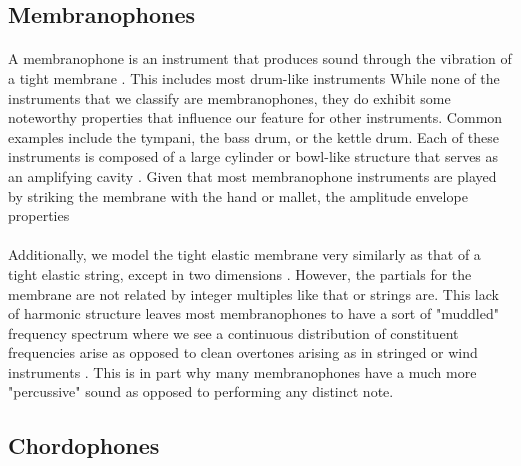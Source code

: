 \documentclass[12pt,letterpaper]{article}
\begin{document}

\subsection{Membranophones}
\label{subsec-membranophones}

\paragraph*{}A membranophone is an instrument that produces sound through the vibration of a tight membrane \cite{Hornbostel}. This includes most drum-like instruments While none of the instruments that we classify are membranophones, they do exhibit some noteworthy properties that influence our feature for other instruments. Common examples include the tympani, the bass drum, or the kettle drum. Each of these instruments is composed of a large cylinder or bowl-like structure that serves as an amplifying cavity \cite{Olson,White}. Given that most membranophone instruments are played by striking the membrane with the hand or mallet, the amplitude envelope properties 

\paragraph*{}Additionally, we model the tight elastic membrane very similarly as that of a tight elastic string, except in two dimensions \cite{White}. However, the partials for the membrane are not related by integer multiples like that or strings are. This lack of harmonic structure leaves most membranophones to have a sort of "muddled" frequency spectrum where we see a continuous distribution of constituent frequencies arise as opposed to clean overtones arising as in stringed or wind instruments \cite{White,Olson}. This is in part why many membranophones have a much more "percussive" sound as opposed to performing any distinct note.


\subsection{Chordophones}
\label{subsec-chordophones}
\end{document}
